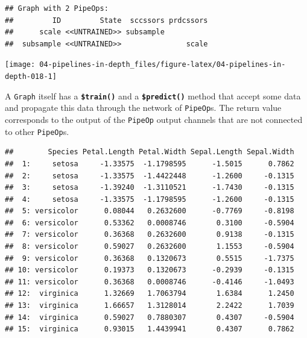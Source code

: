\documentclass[]{scrbook}
\newenvironment{Shaded}{\begin{snugshade}}{\end{snugshade}}
\newcommand{\DataTypeTok}[1]{\textcolor[rgb]{0.13,0.29,0.53}{#1}}
\newcommand{\DecValTok}[1]{\textcolor[rgb]{0.00,0.00,0.81}{#1}}
\newcommand{\KeywordTok}[1]{\textcolor[rgb]{0.13,0.29,0.53}{\textbf{#1}}}
\newcommand{\NormalTok}[1]{#1}
\newcommand{\OperatorTok}[1]{\textcolor[rgb]{0.81,0.36,0.00}{\textbf{#1}}}
\newcommand{\OtherTok}[1]{\textcolor[rgb]{0.56,0.35,0.01}{#1}}
\renewenvironment{Shaded} {\begin{snugshade}\small} {\end{snugshade}}
\begin{document}
\begin{verbatim}
## Graph with 2 PipeOps:
##         ID         State  sccssors prdcssors
##      scale <<UNTRAINED>> subsample          
##  subsample <<UNTRAINED>>               scale
\end{verbatim}

\begin{Shaded}
\end{Shaded}

\begin{center}\texttt{[image: 04-pipelines-in-depth\_files/figure-latex/04-pipelines-in-depth-018-1]} \end{center}

A \texttt{Graph} itself has a \textbf{\texttt{\$train()}} and a \textbf{\texttt{\$predict()}} method that accept some data and propagate this data through the network of \texttt{PipeOp}s.
The return value corresponds to the output of the \texttt{PipeOp} output channels that are not connected to other \texttt{PipeOp}s.

\begin{Shaded}
\end{Shaded}

\begin{verbatim}
##        Species Petal.Length Petal.Width Sepal.Length Sepal.Width
##  1:     setosa     -1.33575  -1.1798595      -1.5015      0.7862
##  2:     setosa     -1.33575  -1.4422448      -1.2600     -0.1315
##  3:     setosa     -1.39240  -1.3110521      -1.7430     -0.1315
##  4:     setosa     -1.33575  -1.1798595      -1.2600     -0.1315
##  5: versicolor      0.08044   0.2632600      -0.7769     -0.8198
##  6: versicolor      0.53362   0.0008746       0.3100     -0.5904
##  7: versicolor      0.36368   0.2632600       0.9138     -0.1315
##  8: versicolor      0.59027   0.2632600       1.1553     -0.5904
##  9: versicolor      0.36368   0.1320673       0.5515     -1.7375
## 10: versicolor      0.19373   0.1320673      -0.2939     -0.1315
## 11: versicolor      0.36368   0.0008746      -0.4146     -1.0493
## 12:  virginica      1.32669   1.7063794       1.6384      1.2450
## 13:  virginica      1.66657   1.3128014       2.2422      1.7039
## 14:  virginica      0.59027   0.7880307       0.4307     -0.5904
## 15:  virginica      0.93015   1.4439941       0.4307      0.7862
\end{verbatim}
\end{document}
